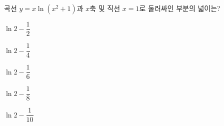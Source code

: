 곡선 $y=x\ln (x^2+1)$과 $x$축 및 직선 $x=1$로 둘러싸인 부분의 넓이는?
\begin{choices32}{\rule[-3ex]{0pt}{8ex}$\ln 2-\dfrac{1}{2}$}{\rule[-3ex]{0pt}{8ex}$\ln 2-\dfrac{1}{4}$}{\rule[-3ex]{0pt}{8ex}$\ln 2-\dfrac{1}{6}$}{\rule[-3ex]{0pt}{8ex}$\ln 2-\dfrac{1}{8}$}{\rule[-3ex]{0pt}{8ex}$\ln 2-\dfrac{1}{10}$}\end{choices32}
